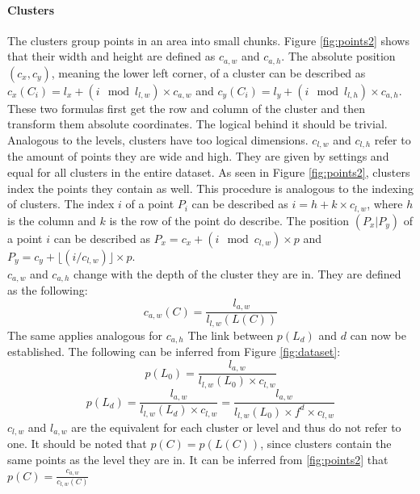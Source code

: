 \documentclass[10pt,a4paper,titlepage]{article}
\begin{document}
	\paragraph{Clusters}\label{sec:clusters}
	The clusters group points in an area into small chunks. Figure \ref{fig:points2} shows that their width and height are defined as \(c_{a,w}\) and \(c_{a,h}\). The absolute position \((c_x,c_y)\), meaning the lower left corner, of a cluster can be described as \(c_x(C_i) = l_x + (i \mod l_{l,w}) \times c_{a,w}\) and \(c_y(C_i) = l_y + (i \mod l_{l,h}) \times c_{a,h}\). These two formulas first get the row and column of the cluster and then transform them absolute coordinates. The logical behind it should be trivial.\\	
	Analogous to the levels, clusters have too logical dimensions. \(c_{l,w}\) and \(c_{l,h}\) refer to the amount of points they are wide and high. They are given by settings and equal for all clusters in the entire dataset. As seen in Figure \ref{fig:points2}, clusters index the points they contain as well. This procedure is analogous to the indexing of clusters. The index \(i\) of a point \(P_i\) can be described as \(i = h + k \times c_{l,w}\), where \(h\) is the column and \(k\) is the row of the point do describe. The position \((P_x|P_y)\) of a point \(i\) can be described as \(P_x = c_x + (i \mod c_{l,w}) \times p\) and \(P_y = c_y + \lfloor (i / c_{l,w}) \rfloor \times p\).\\
	\(c_{a,w}\) and \(c_{a,h}\) change with the depth of the cluster they are in. They are defined as the following:
	\[c_{a,w}(C) = \frac{l_{a,w}}{l_{l,w}(L(C))}\]
	The same applies analogous for \(c_{a,h}\)
	The link between \(p(L_d)\) and \(d\) can now be established. The following can be inferred from Figure \ref{fig:dataset}:
	\[p(L_0) = \frac{l_{a,w}}{l_{l,w}(L_0) \times c_{l,w}}\]
	\[p(L_d) = \frac{l_{a,w}}{l_{l,w}(L_d) \times c_{l,w}} = \frac{l_{a,w}}{l_{l,w}(L_0) \times f^d \times c_{l,w}}\]
	\(c_{l,w}\) and \(l_{a,w}\) are the equivalent for each cluster or level and thus do not refer to one. It should be noted that \(p(C) = p(L(C))\), since clusters contain the same points as the level they are in. It can be inferred from \ref{fig:points2} that \(p(C) = \frac{c_{a,w}}{c_{l,w}(C)}\)\\
\end{document}
